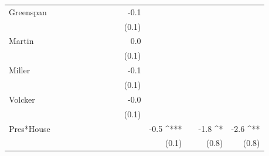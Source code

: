 \documentclass[a4paper]{article}\usepackage{graphicx, color}
\begin{document}
\begin{table}[ht]
\begin{center}
{\begin{tabular}{ l D{.}{.}{1}D{.}{.}{1}D{.}{.}{1}D{.}{.}{1}D{.}{.}{1}D{.}{.}{1}D{.}{.}{1}D{.}{.}{1}D{.}{.}{1}D{.}{.}{1}D{.}{.}{1}D{.}{.}{1}D{.}{.}{1} }
Greenspan            &                &                &                &                &                &                &                &                & -0.1           &                &                &                &               \\ 
                     &                &                &                &                &                &                &                &                & (0.1)          &                &                &                &               \\ 
Martin               &                &                &                &                &                &                &                &                & 0.0            &                &                &                &               \\ 
                     &                &                &                &                &                &                &                &                & (0.1)          &                &                &                &               \\ 
Miller               &                &                &                &                &                &                &                &                & -0.1           &                &                &                &               \\ 
                     &                &                &                &                &                &                &                &                & (0.1)          &                &                &                &               \\ 
Volcker              &                &                &                &                &                &                &                &                & -0.0           &                &                &                &               \\ 
                     &                &                &                &                &                &                &                &                & (0.1)          &                &                &                &               \\ 
Pres*House           &                &                &                &                &                &                &                &                &                & -0.5 ^{***}    &                & -1.8 ^*        & -2.6 ^{**}    \\ 
                     &                &                &                &                &                &                &                &                &                & (0.1)          &                & (0.8)          & (0.8)         \\ 

\end{tabular}}
\end{center}
\end{table}
\end{document}
